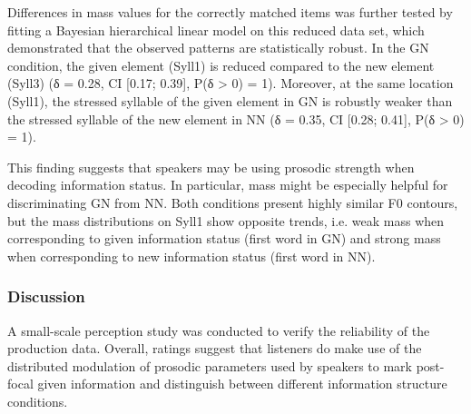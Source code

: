 Differences in mass values for the correctly matched items was further tested by fitting a Bayesian hierarchical linear model on this reduced data set, which demonstrated that the observed patterns are statistically robust. In the GN condition, the given element (Syll1) is reduced compared to the new element (Syll3) (δ = 0.28, CI [0.17; 0.39], P(δ > 0) = 1). Moreover, at the same location (Syll1), the stressed syllable of the given element in GN is robustly weaker than the stressed syllable of the new element in NN (δ = 0.35, CI [0.28; 0.41], P(δ > 0) = 1).

This finding suggests that speakers may be using prosodic strength when decoding information status. In particular, mass might be especially helpful for discriminating GN from NN. Both conditions present highly similar F0 contours, but the mass distributions on Syll1 show opposite trends, i.e. weak mass when corresponding to given information status (first word in GN) and strong mass when corresponding to new information status (first word in NN). 

\subsubsection{Discussion}
\hypertarget{Toc191305904}{}
A small-scale perception study was conducted to verify the reliability of the production data. Overall, ratings suggest that listeners do make use of the distributed modulation of prosodic parameters used by speakers to mark post-focal given information and distinguish between different information structure conditions.

